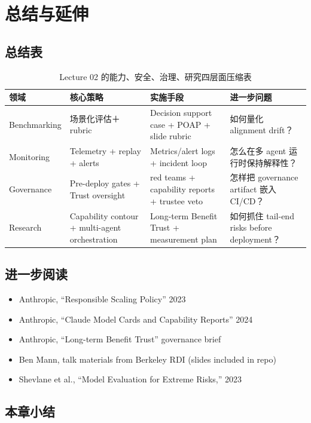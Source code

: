 \section{总结与延伸}

\subsection{总结表}

\begin{table}[H]
\centering
\begin{tabular}{p{} p{} p{} p{}}
\toprule
领域 & 核心策略 & 实施手段 & 进一步问题 \\
\midrule
Benchmarking & 场景化评估＋rubric & Decision support case + POAP + slide rubric & 如何量化 alignment drift？ \\
Monitoring & Telemetry + replay + alerts & Metrics/alert logs + incident loop & 怎么在多 agent 运行时保持解释性？ \\
Governance & Pre-deploy gates + Trust oversight & red teams + capability reports + trustee veto & 怎样把 governance artifact 嵌入 CI/CD？ \\
Research & Capability contour + multi-agent orchestration & Long-term Benefit Trust + measurement plan & 如何抓住 tail-end risks before deployment？ \\
\bottomrule
\end{tabular}
\caption{Lecture 02 的能力、安全、治理、研究四层面压缩表}
\end{table}

\subsection{进一步阅读}

\begin{itemize}
    \item Anthropic, ``Responsible Scaling Policy'' 2023
    \item Anthropic, ``Claude Model Cards and Capability Reports'' 2024
    \item Anthropic, ``Long-term Benefit Trust'' governance brief
    \item Ben Mann, talk materials from Berkeley RDI (slides included in repo)
    \item Shevlane et al., ``Model Evaluation for Extreme Risks,'' 2023
\end{itemize}

\subsection{本章小结}


